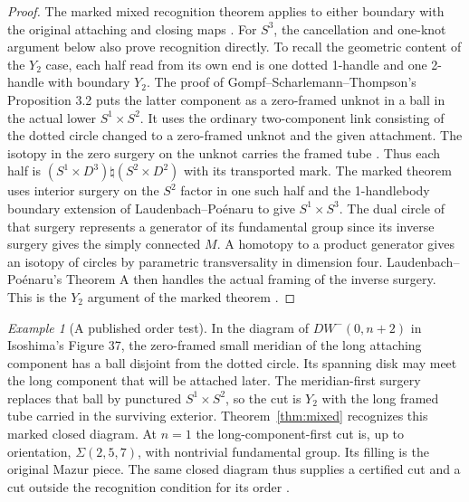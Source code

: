\documentclass[11pt,letterpaper]{article}
\numberwithin{equation}{section}
\theoremstyle{remark}
\newtheorem{example}[theorem]{Example}
\begin{document}
\begin{proof}
The marked mixed recognition theorem applies to either boundary
with the original attaching and closing maps
\cite[mixed recognition theorem]{Baker2026MarkedHeights}.
For \(S^3\), the cancellation and one-knot argument below also
prove recognition directly. To recall the geometric content of the
\(Y_2\) case, each half read from its own end is one dotted 1-handle
and one 2-handle with boundary \(Y_2\).
The proof of Gompf--Scharlemann--Thompson's Proposition 3.2
puts the latter component as a zero-framed unknot in a ball
in the actual lower \(S^1\times S^2\). It uses the ordinary
two-component link consisting of the dotted circle changed to
a zero-framed unknot and the given attachment. The isotopy in
the zero surgery on the unknot carries the framed tube
\cite[Proposition 3.2 and its proof]{GompfScharlemannThompson2010}.
Thus each half is \((S^1\times D^3)\natural(S^2\times D^2)\)
with its transported mark. The marked theorem uses interior
surgery on the \(S^2\) factor in one such half and the
1-handlebody boundary extension of Laudenbach--Po\'enaru to
give \(S^1\times S^3\). The dual circle of that surgery
represents a generator of its fundamental group since its
inverse surgery gives the simply connected \(M\). A homotopy
to a product generator gives an isotopy of circles by
parametric transversality in dimension four. Laudenbach--Po\'enaru's
Theorem A then handles the actual framing of the inverse
surgery. This is the \(Y_2\) argument of the marked theorem
\cite[Theorem A and its proof, pp.~337, 341--342]{LaudenbachPoenaru1972Handlebodies}
\cite[mixed recognition theorem]{Baker2026MarkedHeights}.
\end{proof}

\begin{example}[A published order test]
In the diagram of \(DW^-(0,n+2)\) in Isoshima's Figure 37,
the zero-framed small meridian of the long attaching component
has a ball disjoint from the dotted circle. Its spanning disk
may meet the long component that will be attached later.
The meridian-first surgery replaces that ball by punctured
\(S^1\times S^2\), so the cut is \(Y_2\) with the long framed
tube carried in the surviving exterior. Theorem~\ref{thm:mixed}
recognizes this marked closed diagram. At \(n=1\) the
long-component-first cut is, up to orientation,
\(\Sigma(2,5,7)\), with nontrivial fundamental group.
Its filling is the original Mazur piece. The same closed
diagram thus supplies a certified cut and a cut outside
the recognition condition for its order
\cite[Figure 37]{Isoshima2025MazurDoubles}
\cite[\S1, Theorem 2, and \S5, Figure 22]{AkbulutKirby1979Mazur}.
\end{example}
\end{document}
